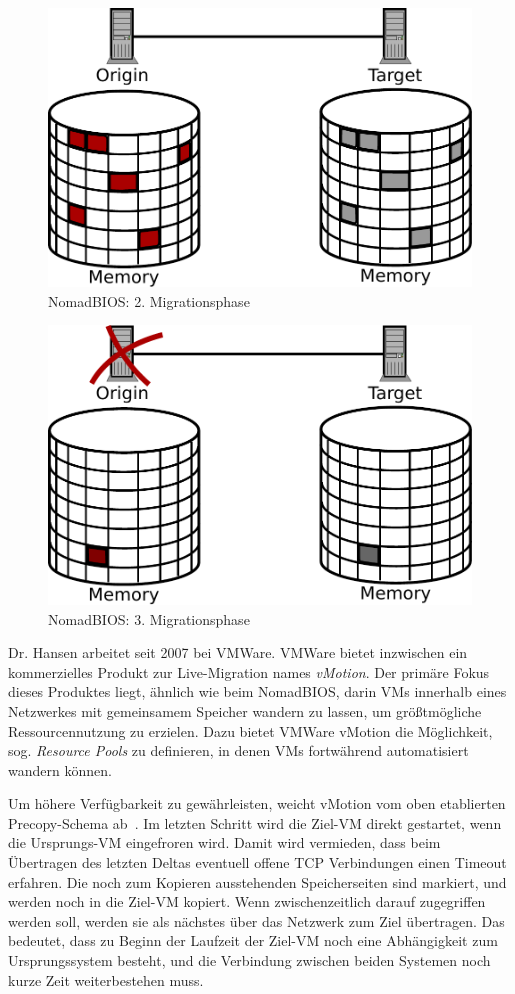 \begin{figure}[t]
  \centering
  \includegraphics[width=0.7\linewidth]{images/nomad_stage2}
  \caption{NomadBIOS: 2. Migrationsphase}
  \label{fig:nomad_stage2}
\end{figure}
\begin{figure}[b]
  \centering
  \includegraphics[width=0.7\linewidth]{images/nomad_stage3}
  \caption{NomadBIOS: 3. Migrationsphase}
  \label{fig:nomad_stage3}
\end{figure}

Dr. Hansen arbeitet seit 2007 bei VMWare. VMWare bietet inzwischen ein
kommerzielles Produkt zur Live-Migration names \emph{vMotion}. Der
primäre Fokus dieses Produktes liegt, ähnlich wie beim NomadBIOS,
darin VMs innerhalb eines Netzwerkes mit gemeinsamem Speicher wandern
zu lassen, um größtmögliche Ressourcennutzung zu erzielen. Dazu bietet
VMWare vMotion die Möglichkeit, sog. \emph{Resource Pools} zu
definieren, in denen VMs fortwährend automatisiert wandern
können. 

Um höhere Verfügbarkeit zu gewährleisten, weicht vMotion vom oben
etablierten Precopy-Schema ab~\cite{nelson2005fast}. Im letzten
Schritt wird die Ziel-VM direkt gestartet, wenn die Ursprungs-VM
eingefroren wird. Damit wird vermieden, dass beim Übertragen des
letzten Deltas eventuell offene TCP Verbindungen einen Timeout
erfahren. Die noch zum Kopieren ausstehenden Speicherseiten sind
markiert, und werden noch in die Ziel-VM kopiert. Wenn
zwischenzeitlich darauf zugegriffen werden soll, werden sie als
nächstes über das Netzwerk zum Ziel übertragen. Das bedeutet, dass zu
Beginn der Laufzeit der Ziel-VM noch eine Abhängigkeit zum
Ursprungssystem besteht, und die Verbindung zwischen beiden Systemen
noch kurze Zeit weiterbestehen muss.

